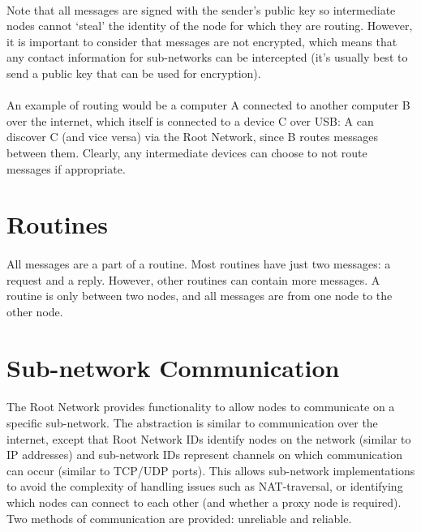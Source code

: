 \documentclass{article}
\begin{document}
\paragraph{}
Note that all messages are signed with the sender's public key so intermediate nodes cannot `steal' the identity of the node for which they are routing. However, it is important to consider that messages are not encrypted, which means that any contact information for sub-networks can be intercepted (it's usually best to send a public key that can be used for encryption).

\paragraph{}
An example of routing would be a computer A connected to another computer B over the internet, which itself is connected to a device C over USB: A can discover C (and vice versa) via the Root Network, since B routes messages between them. Clearly, any intermediate devices can choose to not route messages if appropriate.

\section{Routines}

\paragraph{}
All messages are a part of a routine. Most routines have just two messages: a request and a reply. However, other routines can contain more messages. A routine is only between two nodes, and all messages are from one node to the other node.

\section{Sub-network Communication}

\paragraph{}
The Root Network provides functionality to allow nodes to communicate on a specific sub-network. The abstraction is similar to communication over the internet, except that Root Network IDs identify nodes on the network (similar to IP addresses) and sub-network IDs represent channels on which communication can occur (similar to TCP/UDP ports). This allows sub-network implementations to avoid the complexity of handling issues such as NAT-traversal, or identifying which nodes can connect to each other (and whether a proxy node is required). Two methods of communication are provided: unreliable and reliable.
\end{document}
